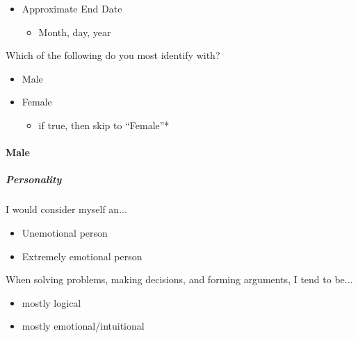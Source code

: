 \documentclass[twoside]{report}
\begin{document}
\begin{multicols}{2}
 \begin{itemize}
  \item
        Approximate End Date

        \begin{itemize}
         \item
               Month, day, year
        \end{itemize}
 \end{itemize}

 Which of the following do you most identify with?

 \begin{itemize}
  \item
        Male
 \end{itemize}

 \begin{itemize}
  \item
        Female

        \begin{itemize}
         \item
               if true, then skip to ``Female''*
        \end{itemize}
 \end{itemize}

 \paragraph{Male}

 \subparagraph{Personality}

 I would consider myself an...

 \begin{itemize}
  \item
        Unemotional person
 \end{itemize}

 \begin{itemize}
  \item
        Extremely emotional person
 \end{itemize}

 When solving problems, making decisions, and forming arguments, I tend to be...

 \begin{itemize}
  \item
        mostly logical
 \end{itemize}

 \begin{itemize}
  \item
        mostly emotional/intuitional
 \end{itemize}


\end{multicols}
\end{document}
